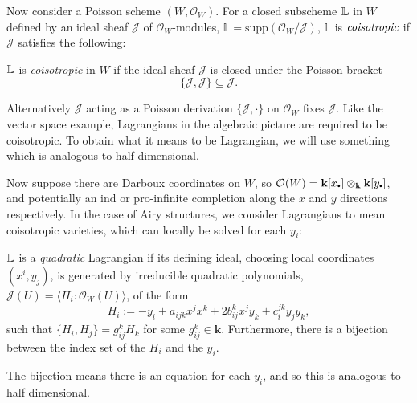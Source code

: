     Now consider a Poisson scheme \( (W, \mathcal{O}_W)\). For a closed subscheme \(\mathbb{L}\) in \(W\) defined by an ideal sheaf \(\mathcal{J}\) of \( \mathcal{O}_W\)-modules,
    \( \mathbb{L} = \mathrm{supp}( \mathcal{O}_W/\mathcal{J})\),
    \( \mathbb{L}\) is \( \emph{coisotropic}\) if \( \mathcal{J}\) satisfies the following:
    
    
    \begin{defn} 
    \label{defn:lagrangian}
    \( \mathbb{L} \) is \emph{coisotropic} in \(W\) if the ideal sheaf \(\mathcal{J}\) is closed under the Poisson bracket \[ \{ \mathcal{J} , \mathcal{J} \} \subseteq \mathcal{J}.\]
    \end{defn}
    Alternatively \( \mathcal{J}\) acting as a Poisson derivation  \( \{ \mathcal{ J} , \cdot \} \) on \( \mathcal{O}_W\) fixes \( \mathcal{J}\). Like the vector space example, Lagrangians in the algebraic picture are required to be coisotropic. To obtain what it means to be Lagrangian, we will use something which is analogous to half-dimensional. 
    
    Now suppose there are Darboux coordinates on \(W\), so \( \mathcal{O}(W) = \mathbf{k}[x_{\sbt}]  \otimes_{\mathbf{k}} \mathbf{k} [y_{\sbt}]\), and potentially an ind or pro-infinite completion along the \(x\) and \(y\) directions respectively. In the case of Airy structures, we consider Lagrangians to mean coisotropic varieties, which can locally be solved for each \(y_i\):
    \begin{defn}
    \label{defn:quadlag}
    \( \mathbb{L}\) is a \emph{quadratic} Lagrangian if its defining ideal, choosing local coordinates \( (x^i,y_j)\), is generated by irreducible quadratic polynomials, \( \mathcal{J}(U) = \langle H_i : \mathcal{O}_W(U) \rangle \),  of the form 
    \[ H_i := -y_i + a_{ijk} x^j x^k + 2 b_{ij}^k x^j y_k + c_i^{jk} y_j y_k,\]
    such that \( \{ H_i , H_j \} = g_{ij}^k H_k\) for some \(g_{ij}^k \in \mathbf{k}\). Furthermore, there is a bijection between the index set of the \(H_i\) and the \(y_i\).
    \end{defn} 
    The bijection means there is an equation for each \(y_i\), and so this is analogous to half dimensional.
    

